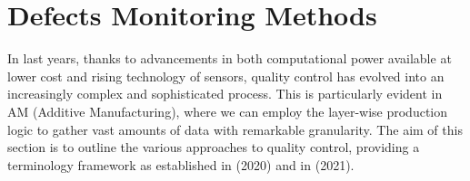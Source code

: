 
\section{Defects Monitoring Methods}
\label{sec:comelotrovo}
In last years, thanks to advancements in both computational power available at lower cost and rising technology of sensors, quality control has evolved into an increasingly complex and sophisticated process. This is particularly evident in AM (Additive Manufacturing), where we can employ the layer-wise production logic to gather vast amounts of data with remarkable granularity. The aim of this section is to outline the various approaches to quality control, providing a terminology framework as established in \citeauthor{richard_leach_integrated_2020} (2020) and in \citeauthor{grasso_-situ_2021} (2021).

